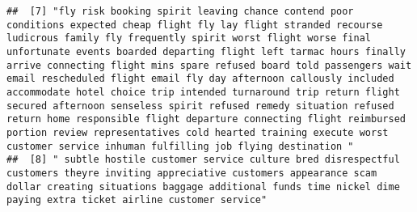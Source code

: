 \documentclass[
]{article}
\begin{document}
\begin{verbatim}
##  [7] "fly risk booking spirit leaving chance contend poor conditions expected cheap flight fly lay flight stranded recourse ludicrous family fly frequently spirit worst flight worse final unfortunate events boarded departing flight left tarmac hours finally arrive connecting flight mins spare refused board told passengers wait email rescheduled flight email fly day afternoon callously included accommodate hotel choice trip intended turnaround trip return flight secured afternoon senseless spirit refused remedy situation refused return home responsible flight departure connecting flight reimbursed portion review representatives cold hearted training execute worst customer service inhuman fulfilling job flying destination "                                                                                                                                                                                                                                                                                                                                                                                                                     
##  [8] " subtle hostile customer service culture bred disrespectful customers theyre inviting appreciative customers appearance scam dollar creating situations baggage additional funds time nickel dime paying extra ticket airline customer service"                                                                                                                                                                                                                                                                                                                                                                                                                                                                                                                                                                                                                                                                                                                                                                                                                                                                                                                           

\end{verbatim}
\end{document}
